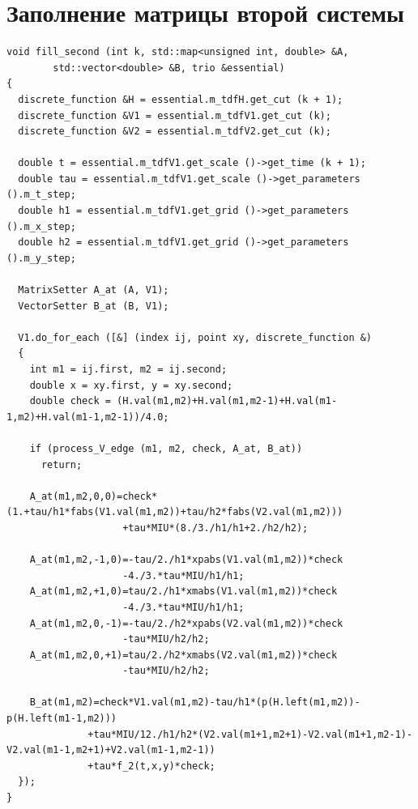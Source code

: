 \documentclass[a4paper,11pt]{article}
\begin{document}
\section{Заполнение матрицы второй системы}
\begin{verbatim}
void fill_second (int k, std::map<unsigned int, double> &A, 
		std::vector<double> &B, trio &essential)
{
  discrete_function &H = essential.m_tdfH.get_cut (k + 1);
  discrete_function &V1 = essential.m_tdfV1.get_cut (k);
  discrete_function &V2 = essential.m_tdfV2.get_cut (k);

  double t = essential.m_tdfV1.get_scale ()->get_time (k + 1);
  double tau = essential.m_tdfV1.get_scale ()->get_parameters ().m_t_step;
  double h1 = essential.m_tdfV1.get_grid ()->get_parameters ().m_x_step;
  double h2 = essential.m_tdfV1.get_grid ()->get_parameters ().m_y_step;

  MatrixSetter A_at (A, V1);
  VectorSetter B_at (B, V1);

  V1.do_for_each ([&] (index ij, point xy, discrete_function &)
  {
    int m1 = ij.first, m2 = ij.second;
    double x = xy.first, y = xy.second;
    double check = (H.val(m1,m2)+H.val(m1,m2-1)+H.val(m1-1,m2)+H.val(m1-1,m2-1))/4.0;

    if (process_V_edge (m1, m2, check, A_at, B_at))
      return;

    A_at(m1,m2,0,0)=check*(1.+tau/h1*fabs(V1.val(m1,m2))+tau/h2*fabs(V2.val(m1,m2)))
                    +tau*MIU*(8./3./h1/h1+2./h2/h2);

    A_at(m1,m2,-1,0)=-tau/2./h1*xpabs(V1.val(m1,m2))*check
                    -4./3.*tau*MIU/h1/h1;
    A_at(m1,m2,+1,0)=tau/2./h1*xmabs(V1.val(m1,m2))*check
                    -4./3.*tau*MIU/h1/h1;
    A_at(m1,m2,0,-1)=-tau/2./h2*xpabs(V2.val(m1,m2))*check
                    -tau*MIU/h2/h2;
    A_at(m1,m2,0,+1)=tau/2./h2*xmabs(V2.val(m1,m2))*check
                    -tau*MIU/h2/h2;

    B_at(m1,m2)=check*V1.val(m1,m2)-tau/h1*(p(H.left(m1,m2))-p(H.left(m1-1,m2)))
              +tau*MIU/12./h1/h2*(V2.val(m1+1,m2+1)-V2.val(m1+1,m2-1)-V2.val(m1-1,m2+1)+V2.val(m1-1,m2-1))
              +tau*f_2(t,x,y)*check;
  });
}
\end{verbatim}
\newpage
\end{document}
